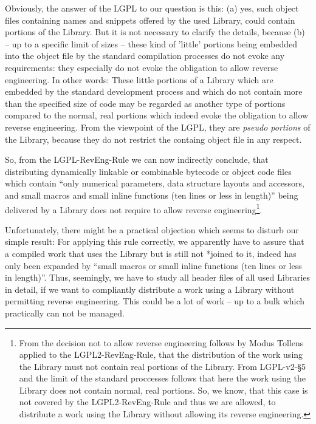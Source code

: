 Obviously, the answer of the LGPL to our question is this: (a) yes, such
object files containing names and snippets offered by the used Library, could
contain portions of the Library. But it is not necessary to clarify the details,
because (b) -- up to a specific limit of sizes -- these kind of 'little'
portions being embedded into the object file by the standard compilation
processes do not evoke any requirements: they especially do not evoke the
obligation to allow reverse engineering. In other words: These little portions
of a Library which are embedded by the standard development process and which do
not contain more than the specified size of code may be regarded as another type
of portions compared to the normal, real portions which indeed evoke the
obligation to allow reverse engineering. From the viewpoint of the LGPL, they
are \emph{pseudo portions} of the Library, because they do not restrict the
containg object file in any respect.

So, from the LGPL-RevEng-Rule we can now indirectly conclude, that distributing
dynamically linkable or combinable bytecode or object code files which contain
\enquote{only numerical parameters, data structure layouts and accessors, and
small macros and small inline functions (ten lines or less in length)} being
delivered by a Library does not require to allow reverse
engineering\footnote{From the decision not to allow reverse engineering follows
by Modus Tollens applied to the LGPL2-RevEng-Rule, that the distribution of the
work using the Library must not contain real portions of the Library. From
LGPL-v2-§5 and the limit of the standard proccesses follows that here the work
using the Library does not contain normal, real portions. So, we know, that this
case is not covered by the LGPL2-RevEng-Rule and thus we are allowed, to
distribute a work using the Library without allowing its reverse engineering.}.

Unfortunately, there might be a practical objection which seems to disturb our
simple result: For applying this rule correctly, we apparently have to assure
that a compiled work that uses the Library but is still not *joined to it,
indeed has only been expanded by \enquote{small macros or small inline functions
(ten lines or less in length)}. Thus, seemingly, we have to study all header
files of all used Libraries in detail, if we want to compliantly distribute a
work using a Library without permitting reverse engineering. This could be a lot
of work -- up to a bulk which practically can not be managed.

